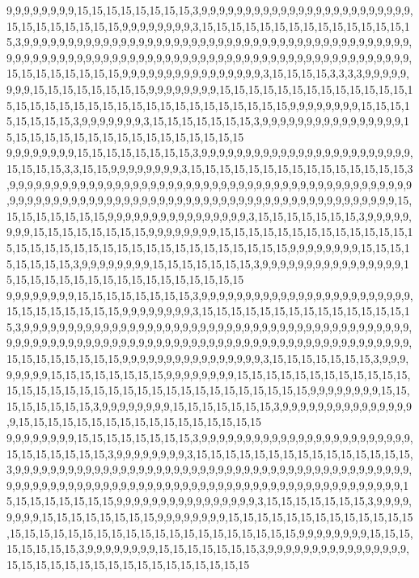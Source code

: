 9,9,9,9,9,9,9,9,15,15,15,15,15,15,15,15,3,9,9,9,9,9,9,9,9,9,9,9,9,9,9,9,9,9,9,9,9,9,9,9,9,15,15,15,15,15,15,15,15,9,9,9,9,9,9,9,9,3,15,15,15,15,15,15,15,15,15,15,15,15,15,15,15,3,9,9,9,9,9,9,9,9,9,9,9,9,9,9,9,9,9,9,9,9,9,9,9,9,9,9,9,9,9,9,9,9,9,9,9,9,9,9,9,9,9,9,9,9,9,9,9,9,9,9,9,9,9,9,9,9,9,9,9,9,9,9,9,9,9,9,9,9,9,9,9,9,9,9,9,9,9,9,9,9,9,9,9,9,9,9,9,9,9,9,15,15,15,15,15,15,15,15,9,9,9,9,9,9,9,9,9,9,9,9,9,9,9,9,3,15,15,15,15,3,3,3,3,9,9,9,9,9,9,9,9,15,15,15,15,15,15,15,15,9,9,9,9,9,9,9,9,15,15,15,15,15,15,15,15,15,15,15,15,15,15,15,15,15,15,15,15,15,15,15,15,15,15,15,15,15,15,15,15,15,9,9,9,9,9,9,9,9,15,15,15,15,15,15,15,15,3,9,9,9,9,9,9,9,3,15,15,15,15,15,15,15,3,9,9,9,9,9,9,9,9,9,9,9,9,9,9,9,9,15,15,15,15,15,15,15,15,15,15,15,15,15,15,15,15,15
9,9,9,9,9,9,9,9,15,15,15,15,15,15,15,15,3,9,9,9,9,9,9,9,9,9,9,9,9,9,9,9,9,9,9,9,9,9,9,9,9,15,15,15,15,3,3,15,15,9,9,9,9,9,9,9,9,3,15,15,15,15,15,15,15,15,15,15,15,15,15,15,15,3,9,9,9,9,9,9,9,9,9,9,9,9,9,9,9,9,9,9,9,9,9,9,9,9,9,9,9,9,9,9,9,9,9,9,9,9,9,9,9,9,9,9,9,9,9,9,9,9,9,9,9,9,9,9,9,9,9,9,9,9,9,9,9,9,9,9,9,9,9,9,9,9,9,9,9,9,9,9,9,9,9,9,9,9,9,9,9,9,9,9,15,15,15,15,15,15,15,15,9,9,9,9,9,9,9,9,9,9,9,9,9,9,9,9,3,15,15,15,15,15,15,15,3,9,9,9,9,9,9,9,9,15,15,15,15,15,15,15,15,9,9,9,9,9,9,9,9,15,15,15,15,15,15,15,15,15,15,15,15,15,15,15,15,15,15,15,15,15,15,15,15,15,15,15,15,15,15,15,15,15,9,9,9,9,9,9,9,9,15,15,15,15,15,15,15,15,3,9,9,9,9,9,9,9,9,15,15,15,15,15,15,15,3,9,9,9,9,9,9,9,9,9,9,9,9,9,9,9,9,15,15,15,15,15,15,15,15,15,15,15,15,15,15,15,15,15
9,9,9,9,9,9,9,9,15,15,15,15,15,15,15,15,3,9,9,9,9,9,9,9,9,9,9,9,9,9,9,9,9,9,9,9,9,9,9,9,9,15,15,15,15,15,15,15,15,9,9,9,9,9,9,9,9,3,15,15,15,15,15,15,15,15,15,15,15,15,15,15,15,3,9,9,9,9,9,9,9,9,9,9,9,9,9,9,9,9,9,9,9,9,9,9,9,9,9,9,9,9,9,9,9,9,9,9,9,9,9,9,9,9,9,9,9,9,9,9,9,9,9,9,9,9,9,9,9,9,9,9,9,9,9,9,9,9,9,9,9,9,9,9,9,9,9,9,9,9,9,9,9,9,9,9,9,9,9,9,9,9,9,9,15,15,15,15,15,15,15,15,9,9,9,9,9,9,9,9,9,9,9,9,9,9,9,9,3,15,15,15,15,15,15,15,3,9,9,9,9,9,9,9,9,15,15,15,15,15,15,15,15,9,9,9,9,9,9,9,9,15,15,15,15,15,15,15,15,15,15,15,15,15,15,15,15,15,15,15,15,15,15,15,15,15,15,15,15,15,15,15,15,15,9,9,9,9,9,9,9,9,15,15,15,15,15,15,15,15,3,9,9,9,9,9,9,9,9,15,15,15,15,15,15,15,3,9,9,9,9,9,9,9,9,9,9,9,9,9,9,9,9,15,15,15,15,15,15,15,15,15,15,15,15,15,15,15,15,15
9,9,9,9,9,9,9,9,15,15,15,15,15,15,15,15,3,9,9,9,9,9,9,9,9,9,9,9,9,9,9,9,9,9,9,9,9,9,9,9,9,15,15,15,15,15,15,15,3,9,9,9,9,9,9,9,9,3,15,15,15,15,15,15,15,15,15,15,15,15,15,15,15,3,9,9,9,9,9,9,9,9,9,9,9,9,9,9,9,9,9,9,9,9,9,9,9,9,9,9,9,9,9,9,9,9,9,9,9,9,9,9,9,9,9,9,9,9,9,9,9,9,9,9,9,9,9,9,9,9,9,9,9,9,9,9,9,9,9,9,9,9,9,9,9,9,9,9,9,9,9,9,9,9,9,9,9,9,9,9,9,9,9,9,15,15,15,15,15,15,15,15,9,9,9,9,9,9,9,9,9,9,9,9,9,9,9,9,3,15,15,15,15,15,15,15,3,9,9,9,9,9,9,9,9,15,15,15,15,15,15,15,15,9,9,9,9,9,9,9,9,15,15,15,15,15,15,15,15,15,15,15,15,15,15,15,15,15,15,15,15,15,15,15,15,15,15,15,15,15,15,15,15,15,9,9,9,9,9,9,9,9,15,15,15,15,15,15,15,15,3,9,9,9,9,9,9,9,9,15,15,15,15,15,15,15,3,9,9,9,9,9,9,9,9,9,9,9,9,9,9,9,9,15,15,15,15,15,15,15,15,15,15,15,15,15,15,15,15,15
